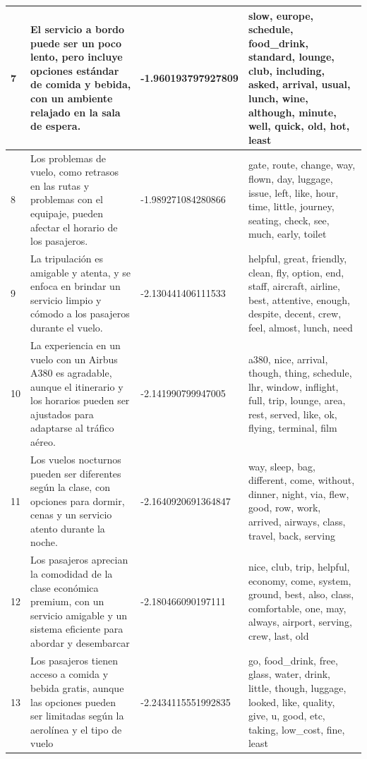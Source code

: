 \documentclass{report}
\begin{document}
\begin{longtable}{|p{1cm}|p{4cm}|p{4cm}|p{6cm}|}
                    \hline
                    7 & El servicio a bordo puede ser un poco lento, pero incluye opciones estándar de comida y bebida, con un ambiente relajado en la sala de espera. & -1.960193797927809 & slow, europe, schedule, food\_drink, standard, lounge, club, including, asked, arrival, usual, lunch, wine, although, minute, well, quick, old, hot, least \\
                    \hline
                    8 & Los problemas de vuelo, como retrasos en las rutas y problemas con el equipaje, pueden afectar el horario de los pasajeros. & -1.989271084280866 & gate, route, change, way, flown, day, luggage, issue, left, like, hour, time, little, journey, seating, check, see, much, early, toilet \\
                    \hline
                    9 & La tripulación es amigable y atenta, y se enfoca en brindar un servicio limpio y cómodo a los pasajeros durante el vuelo. & -2.130441406111533 & helpful, great, friendly, clean, fly, option, end, staff, aircraft, airline, best, attentive, enough, despite, decent, crew, feel, almost, lunch, need \\
                    \hline
                    10 & La experiencia en un vuelo con un Airbus A380 es agradable, aunque el itinerario y los horarios pueden ser ajustados para adaptarse al tráfico aéreo. & -2.141990799947005 & a380, nice, arrival, though, thing, schedule, lhr, window, inflight, full, trip, lounge, area, rest, served, like, ok, flying, terminal, film \\
                    \hline
                    11 & Los vuelos nocturnos pueden ser diferentes según la clase, con opciones para dormir, cenas y un servicio atento durante la noche. & -2.1640920691364847 & way, sleep, bag, different, come, without, dinner, night, via, flew, good, row, work, arrived, airways, class, travel, back, serving \\
                    \hline
                    12 & Los pasajeros aprecian la comodidad de la clase económica premium, con un servicio amigable y un sistema eficiente para abordar y desembarcar & -2.180466090197111 & nice, club, trip, helpful, economy, come, system, ground, best, also, class, comfortable, one, may, always, airport, serving, crew, last, old \\
                    \hline
                    13 & Los pasajeros tienen acceso a comida y bebida gratis, aunque las opciones pueden ser limitadas según la aerolínea y el tipo de vuelo & -2.2434115551992835 & go, food\_drink, free, glass, water, drink, little, though, luggage, looked, like, quality, give, u, good, etc, taking, low\_cost, fine, least \\

\end{longtable}
\end{document}

